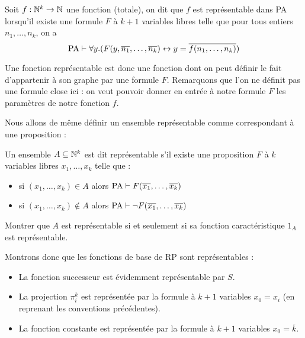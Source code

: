 \begin{defi}
    Soit $f : \mathbb{N}^k\to\mathbb{N}$ une fonction (totale), on dit que $f$ est représentable dans PA lorsqu'il existe une formule $F$ à $k+1$ variables libres telle que pour tous entiers $n_1,\ldots,n_k$, on a $$\mathrm{PA}\vdash \forall y.(F(y,\overline{n_1},\ldots,\overline{n_k}) \leftrightarrow y = \overline{f(n_1,\ldots,n_k)})$$
\end{defi}

Une fonction représentable est donc une fonction dont on peut définir le fait d'appartenir à son graphe par une formule $F$. Remarquons que l'on ne définit pas une formule close ici : on veut pouvoir donner en entrée à notre formule $F$ les paramètres de notre fonction $f$.

Nous allons de même définir un ensemble représentable comme correspondant à une proposition :

\begin{defi}
    Un ensemble $A\subseteq \mathbb{N}^k$ est dit représentable s'il existe une proposition $F$ à $k$ variables libres $x_1,\ldots,x_k$ telle que :
    \begin{itemize}[label=$\bullet$]
        \item si $(x_1,\ldots,x_k)\in A$ alors $\mathrm{PA}\vdash F(\overline{x_1},\ldots,\overline{x_k})$
        \item si $(x_1,\ldots,x_k)\notin A$ alors $\mathrm{PA}\vdash \lnot F(\overline{x_1},\ldots,\overline{x_k})$
    \end{itemize}
\end{defi}

\begin{exo}
    Montrer que $A$ est représentable si et seulement si sa fonction caractéristique $1_A$ est représentable.
\end{exo}

Montrons donc que les fonctions de base de RP sont représentables :

\begin{itemize}[label=$\bullet$]
    \item La fonction successeur est évidemment représentable par $S$.
    \item La projection $\pi_i^k$ est représentée par la formule à $k+1$ variables $x_0=x_i$ (en reprenant les conventions précédentes).
    \item La fonction constante est représentée par la formule à $k+1$ variables $x_0 = \overline k$.
\end{itemize}

